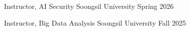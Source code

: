 
\begin{cvhonors}
  \cvhonor
    {Instructor, AI Security}
    {Soongsil University}
    {Spring}
    {2026}

  \cvhonor
    {Instructor, Big Data Analysis}
    {Soongsil University}
    {Fall}
    {2025}
\end{cvhonors}
